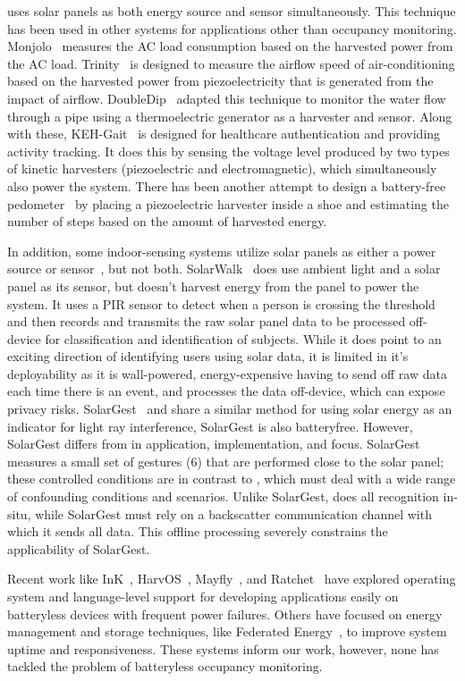  \sysname uses solar panels as both energy source and sensor simultaneously. This technique has been used in other systems for applications other than occupancy monitoring. Monjolo~\cite{debruin2013monjolo} measures the AC load consumption based on the harvested power from the AC load. Trinity~\cite{xiang2013powering} is designed to measure the airflow speed of air-conditioning based on the harvested power from piezoelectricity that is generated from the impact of airflow. DoubleDip~\cite{martin2012doubledip} adapted this technique to monitor the water flow through a pipe using a thermoelectric generator as a harvester and sensor. Along with these, KEH-Gait~\cite{xu2017keh} is designed for healthcare authentication and providing activity tracking. It does this by sensing the voltage level produced by two types of kinetic harvesters (piezoelectric and electromagnetic), which simultaneously also power the system. There has been another attempt to design a battery-free pedometer~\cite{kalantarian2016pedometers} by placing a piezoelectric harvester inside a shoe and estimating the number of steps based on the amount of harvested energy. 

In addition, some indoor-sensing systems utilize solar panels as either a power source or sensor~\cite{campbell2014energy, billah2022solarwalk}, but not both. SolarWalk~\cite{billah2022solarwalk} does use ambient light and a solar panel as its sensor, but doesn't harvest energy from the panel to power the system.  It uses a PIR sensor to detect when a person is crossing the threshold and then records and transmits the raw solar panel data to be processed off-device for classification and identification of subjects.  While it does point to an exciting direction of identifying users using solar data, it is limited in it's deployability as it is wall-powered, energy-expensive having to send off raw data each time there is an event, and processes the data off-device, which can expose privacy risks.
SolarGest~\cite{ma2019solargest} and \sysname share a similar method for using solar energy as an indicator for light ray interference, SolarGest is also batteryfree. However, SolarGest differs from \sysname in application, implementation, and focus. SolarGest measures a small set of gestures (6) that are performed close to the solar panel; these controlled conditions are in contrast to \sysname, which must deal with a wide range of confounding conditions and scenarios. Unlike SolarGest, \sysname does all recognition in-situ, while SolarGest must rely on a backscatter communication channel with which it sends all data. This offline processing severely constrains the applicability of SolarGest.   

Recent work like InK~\cite{yildirim2018ink}, HarvOS~\cite{bhatti2017harvos}, Mayfly~\cite{hester2017mayfly}, and Ratchet~\cite{van2016intermittent} have explored operating system and language-level support for developing applications easily on batteryless devices with frequent power failures.
Others have focused on energy management and storage techniques, like  Federated Energy~\cite{jhester:ufop:sensys}, to improve system uptime and responsiveness.
These systems inform our work, however, none has tackled the problem of batteryless occupancy monitoring.
